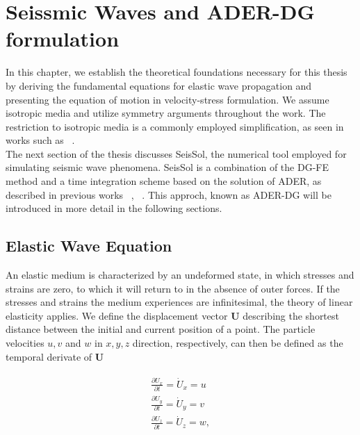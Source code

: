 
\chapter{Seissmic Waves and ADER-DG formulation}\label{chapter:seismicwaves}
In this chapter, we establish the theoretical foundations necessary for this thesis by deriving the fundamental equations for elastic
wave propagation and presenting the equation of motion in velocity-stress formulation. We assume isotropic media and utilize symmetry arguments
throughout the work. The restriction to isotropic media is a commonly employed simplification, as seen in works such as ~\parencite{dumbser1}. \\

The next section of the thesis discusses SeisSol, the numerical tool employed for simulating seismic wave phenomena. SeisSol is a combination
of the \ac{DG-FE} method and a time integration scheme based on the solution of \ac{ADER}, as described in previous works ~\parencite{dumbser1}, ~\parencite{seissol}. This approch, known as 
\ac{ADER}-\ac{DG} will be introduced in more detail in the following sections.

\section{Elastic Wave Equation}\label{section:elasticwaveequation}
An elastic medium is characterized by an undeformed state, in which stresses and strains are zero, to which it will return to in the absence
of outer forces. If the stresses and strains the medium experiences are infinitesimal, the theory of linear elasticity applies. We define
the displacement vector $\mathbf{U}$ describing the shortest distance between the initial and current position of a point. The particle
velocities $u,v$ and $w$ in $x, y, z$ direction, respectively, can then be defined as the temporal derivate of $\mathbf{U}$

\begin{align}
    \begin{split}
    \frac{\partial U_x}{\partial t} = \dot{U}_x = u \\
    \frac{\partial U_y}{\partial t} = \dot{U}_y = v \\
    \frac{\partial U_z}{\partial t} = \dot{U}_z = w, \\
    \end{split}
 \end{align}

